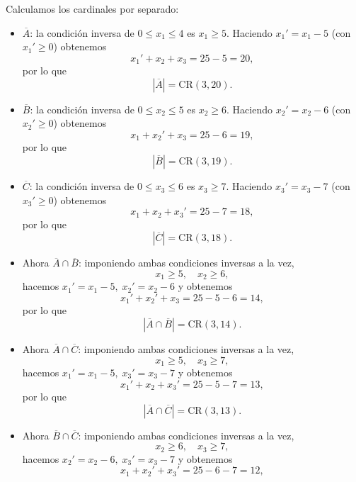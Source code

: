 \documentclass[a4paper,12pt]{article}
\begin{document}
\begin{ejercicio}[title=Ejercicio 31]

Calculamos los cardinales por separado:

\begin{itemize}

\item \(\overline{A}\): la condición inversa de \(0\le x_1\le 4\) es \(x_1\ge 5\).
Haciendo \(x_1' = x_1-5\) (con \(x_1'\ge 0\)) obtenemos
\[
x_1' + x_2 + x_3 = 25-5 = 20,
\]
por lo que
\[
|\overline{A}| = \mathrm{CR}(3,20).
\]

\item \(\overline{B}\): la condición inversa de \(0\le x_2\le 5\) es \(x_2\ge 6\).
Haciendo \(x_2' = x_2-6\) (con \(x_2'\ge 0\)) obtenemos
\[
x_1 + x_2' + x_3 = 25-6 = 19,
\]
por lo que
\[
|\overline{B}| = \mathrm{CR}(3,19).
\]

\item \(\overline{C}\): la condición inversa de \(0\le x_3\le 6\) es \(x_3\ge 7\).
Haciendo \(x_3' = x_3-7\) (con \(x_3'\ge 0\)) obtenemos
\[
x_1 + x_2 + x_3' = 25-7 = 18,
\]
por lo que
\[
|\overline{C}| = \mathrm{CR}(3,18).
\]

\item Ahora \(\overline{A}\cap\overline{B}\): imponiendo ambas condiciones inversas a la vez,
\[
x_1\ge 5,\quad x_2\ge 6,
\]
hacemos \(x_1' = x_1-5,\; x_2' = x_2-6\) y obtenemos
\[
x_1' + x_2' + x_3 = 25-5-6 = 14,
\]
por lo que
\[
|\overline{A}\cap\overline{B}| = \mathrm{CR}(3,14).
\]

\item Ahora \(\overline{A}\cap\overline{C}\): imponiendo ambas condiciones inversas a la vez,
\[
x_1\ge 5,\quad x_3\ge 7,
\]
hacemos \(x_1' = x_1-5,\; x_3' = x_3-7\) y obtenemos
\[
x_1' + x_2 + x_3' = 25-5-7 = 13,
\]
por lo que
\[
|\overline{A}\cap\overline{C}| = \mathrm{CR}(3,13).
\]

\item Ahora \(\overline{B}\cap\overline{C}\): imponiendo ambas condiciones inversas a la vez,
\[
x_2\ge 6,\quad x_3\ge 7,
\]
hacemos \(x_2' = x_2-6,\; x_3' = x_3-7\) y obtenemos
\[
x_1 + x_2' + x_3' = 25-6-7 = 12,
\]
\end{itemize}
\end{ejercicio}
\end{document}
